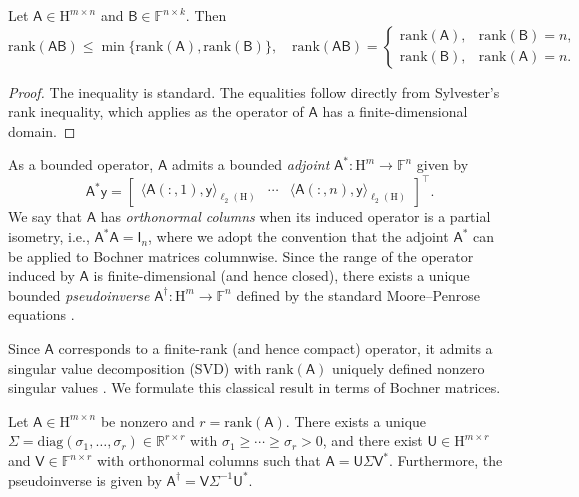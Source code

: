 \documentclass[onefignum,onetabnum]{siamart250211}
\renewenvironment{equation*}{\[}{\]\ignorespacesafterend}
\newcommand{\Real}{\mathbb{R}}
\newcommand{\F}{\mathbb{F}}
\newcommand{\Hilb}{\mathrm{H}}
\newcommand{\Batrix}[1]{\bm{\Matrix{#1}}}
\newcommand{\Matrix}[1]{\mathsf{#1}}
\newcommand{\trans}{\intercal}
\newcommand{\pinv}{\dagger}
\newcommand{\rank}[2][]{\mathrm{rank} #1( #2 #1)}
\newcommand{\Dotp}[4][]{#1\langle #2, #3 #1\rangle_{\mathrm{#4}}}
\begin{document}
\begin{lemma}
\label{lemma:rank_AB}
Let $\Batrix{A} \in \Hilb^{m \times n}$ and $\Matrix{B} \in \F^{n \times k}$.
Then
\begin{equation*}
    \rank{\Batrix{A} \Matrix{B}} \leq \min\{ \rank{\Batrix{A}}, \rank{\Matrix{B}} \}, \quad \rank{\Batrix{A} \Matrix{B}} = \begin{cases}
            \rank{\Batrix{A}}, & \rank{\Matrix{B}} = n, \\
            \rank{\Matrix{B}}, & \rank{\Batrix{A}} = n.
        \end{cases}
\end{equation*}
\end{lemma}
\begin{proof}
    The inequality is standard. 
    The equalities follow directly from Sylvester's rank inequality, which applies as the operator of $\Batrix{A}$ has a finite-dimensional domain.
\end{proof}

As a bounded operator, $\Batrix{A}$ admits a bounded \emph{adjoint} $\Batrix{A}^{\ast} : \Hilb^{m} \to \F^{n}$ given by
\begin{equation*}
    \Batrix{A}^\ast \Batrix{y} = \begin{bmatrix}
        \Dotp{\Batrix{A}(:,1)}{\Batrix{y}}{\ell_2(\Hilb)} &
        \cdots &
        \Dotp{\Batrix{A}(:,n)}{\Batrix{y}}{\ell_2(\Hilb)}
    \end{bmatrix}^\trans.
\end{equation*}
We say that $\Batrix{A}$ has \emph{orthonormal columns} when its induced operator is a partial isometry, i.e., $\Batrix{A}^{\ast} \Batrix{A} = \Matrix{I}_n$, where we adopt the convention that the adjoint $\Batrix{A}^{\ast}$ can be applied to Bochner matrices columnwise.
Since the range of the operator induced by $\Batrix{A}$ is finite-dimensional (and hence closed), there exists a unique bounded \emph{pseudoinverse} $\Batrix{A}^{\pinv} : \Hilb^{m} \to \F^{n}$ defined by the standard Moore--Penrose equations \cite[Ch.~9]{ben2003generalized}.

Since $\Batrix{A}$ corresponds to a finite-rank (and hence compact) operator, it admits a singular value decomposition (SVD) with $\rank{\Batrix{A}}$ uniquely defined nonzero singular values \cite[Ch.~2]{gohberg1969introduction}.
We formulate this classical result in terms of Bochner matrices.

\begin{theorem}
\label{theorem:svd}
Let $\Batrix{A} \in \Hilb^{m \times n}$ be nonzero and $r = \rank{\Batrix{A}}$.
There exists a unique $\Matrix{\Sigma} = \mathrm{diag}(\sigma_1, \ldots, \sigma_r) \in \Real^{r \times r}$ with $\sigma_1 \geq \cdots \geq \sigma_r > 0$, and there exist $\Batrix{U} \in \Hilb^{m \times r}$ and $\Matrix{V} \in \F^{n \times r}$ with orthonormal columns such that $\Batrix{A} = \Batrix{U} \Matrix{\Sigma} \Matrix{V}^\ast$.
Furthermore, the pseudoinverse is given by $\Batrix{A}^{\pinv} = \Matrix{V} \Matrix{\Sigma}^{-1} \Batrix{U}^{\ast}$.
\end{theorem}
\end{document}
